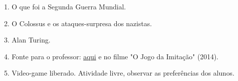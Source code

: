 \begin{enumerate}
	\item O que foi a Segunda Guerra Mundial.
	\item O Colossus e os ataques-surpresa dos nazistas.
	\item Alan Turing.
	\item Fonte para o professor: \href{https://brasilescola.uol.com.br/historiag/maquina-enigma.htm}{aqui} e no filme "O Jogo da Imitação" (2014).
	\item Video-game liberado. Atividade livre, observar as preferências dos alunos.
\end{enumerate}